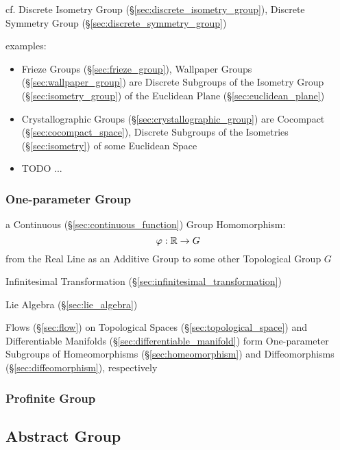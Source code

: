 cf. Discrete Isometry Group (\S\ref{sec:discrete_isometry_group}), Discrete
Symmetry Group (\S\ref{sec:discrete_symmetry_group})

examples:
\begin{itemize}
  \item Frieze Groups (\S\ref{sec:frieze_group}), Wallpaper Groups
    (\S\ref{sec:wallpaper_group}) are Discrete Subgroups of the Isometry Group
    (\S\ref{sec:isometry_group}) of the Euclidean Plane
    (\S\ref{sec:euclidean_plane})
  \item Crystallographic Groups (\S\ref{sec:crystallographic_group}) are
    Cocompact (\S\ref{sec:cocompact_space}), Discrete Subgroups of the
    Isometries (\S\ref{sec:isometry}) of some Euclidean Space
  \item TODO
  ...
\end{itemize}



\subsubsection{One-parameter Group}\label{sec:one_parameter_group}

a Continuous (\S\ref{sec:continuous_function}) Group Homomorphism:
\[
  \varphi : \mathbb{R} \rightarrow G
\]
from the Real Line as an Additive Group to some other Topological Group $G$

Infinitesimal Transformation (\S\ref{sec:infinitesimal_transformation})

Lie Algebra (\S\ref{sec:lie_algebra})

Flows (\S\ref{sec:flow}) on Topological Spaces (\S\ref{sec:topological_space})
and Differentiable Manifolds (\S\ref{sec:differentiable_manifold}) form
One-parameter Subgroups of Homeomorphisms (\S\ref{sec:homeomorphism}) and
Diffeomorphisms (\S\ref{sec:diffeomorphism}), respectively



\subsubsection{Profinite Group}\label{sec:profinite_group}



\subsection{Abstract Group}\label{sec:abstract_group}

